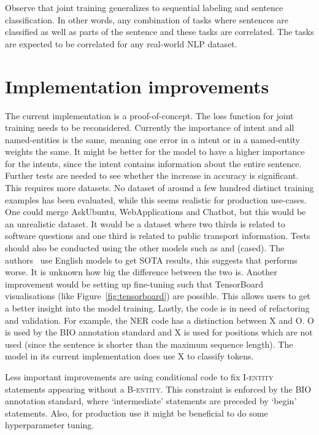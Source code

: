 Observe that joint training generalizes to sequential labeling and sentence classification.
In other words, any combination of tasks where sentences are classified as well as parts of the sentence and these tasks are correlated.
The tasks are expected to be correlated for any real-world NLP dataset.

\section{Implementation improvements}
\label{sec:implementation_improvements}
The current implementation is a proof-of-concept.
The loss function for joint training needs to be reconsidered.
Currently the importance of intent and all named-entities is the same, meaning one error in a intent or in a named-entity weights the same.
It might be better for the model to have a higher importance for the intents, since the intent contains information about the entire sentence.
Further tests are needed to see whether the increase in accuracy is significant.
This requires more datasets.
No dataset of around a few hundred distinct training examples has been evaluated, while this seems realistic for production use-cases.
One could merge AskUbuntu, WebApplications and Chatbot, but this would be an unrealistic dataset.
It would be a dataset where two thirds is related to software questions and one third is related to public transport information.
Tests should also be conducted using the other models such as  and  (cased).
The authors~\citep{devlin2018} use English models to get SOTA results, this suggests that  performs worse.
It is unknown how big the difference between the two is.
Another improvement would be setting up fine-tuning such that TensorBoard visualisations (like Figure~\ref{fig:tensorboard}) are possible.
This allows users to get a better insight into the model training.
Lastly, the code is in need of refactoring and validation.
For example, the NER code has a distinction between X and O.
O is used by the BIO annotation standard and X is used for positions which are not used (since the sentence is shorter than the maximum sequence length).
The model in its current implementation does use X to classify tokens.

Less important improvements are using conditional code to fix I-\textsc{entity} statements appearing without a B-\textsc{entity}.
This constraint is enforced by the BIO annotation standard, where `intermediate' statements are preceded by `begin' statements.
Also, for production use it might be beneficial to do some hyperparameter tuning.


